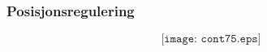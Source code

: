 \documentclass{beamer}
\begin{document}


\begin{frame}
	\frametitle{Posisjonsregulering}

$$\texttt{[image: cont75.eps]}$$
	


\end{frame}
\end{document}
